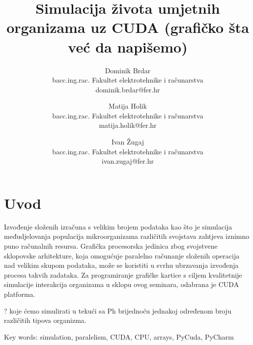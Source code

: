\documentclass[12pt]{article}
\author{
	Dominik Brdar \\
	bacc.ing.rac. Fakultet elektrotehnike i računarstva \\
	dominik.brdar@fer.hr
	\and
	Matija Holik \\
	bacc.ing.rac. Fakultet elektrotehnike i računarstva \\
	matija.holik@fer.hr
	\and
	Ivan Žugaj \\
	bacc.ing.rac. Fakultet elektrotehnike i računarstva \\
	ivan.zugaj@fer.hr
}
\begin{document}
	\begin{titlepage}
	\title{
		Simulacija života umjetnih organizama uz CUDA (grafičko šta već da napišemo)
	}
	\maketitle
	\end{titlepage}

	\section{Uvod}
	Izvođenje složenih izračuna s velikim brojem podataka kao što je simulacija međudjelovanja 
	populacija mikroorganizama različitih svojstava zahtjeva iznimno puno računalnih resursa.
	Grafička procesorska jedinica zbog svojstvene sklopovske arhitekture, koja omogućuje paralelno računanje 
	složenih operacija nad velikim skupom podataka, može se koristiti u svrhu ubrzavanja izvođenja procesa 
	takvih zadataka. Za programiranje grafičke kartice s ciljem kvalitetnije simulacije interakcija organizama 
	u sklopu ovog seminara, odabrana je CUDA platforma.
	
	? koje ćemo simulirati u tekući sa Ph brijednoću jednakoj određenom broju različitih tipova organizma.
	
	Key words: simulation, paralelism, CUDA, CPU, arrays, PyCuda, PyCharm
	
\end{document}

